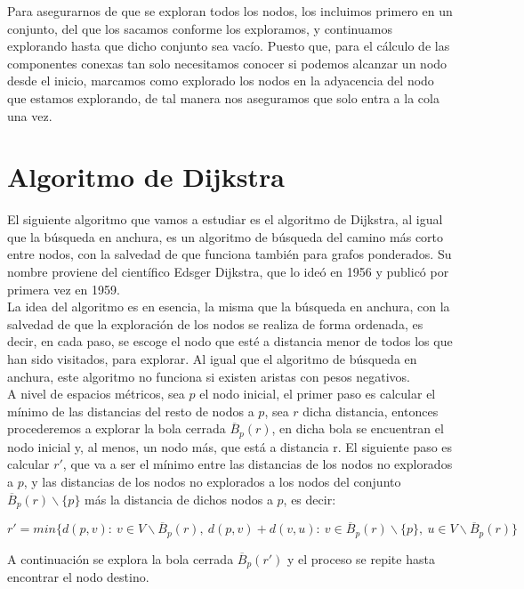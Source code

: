 Para asegurarnos de que se exploran todos los nodos, los incluimos primero en un conjunto, del que los sacamos conforme los exploramos, y continuamos explorando hasta que dicho conjunto sea vacío. Puesto que, para el cálculo de las componentes conexas tan solo necesitamos conocer si podemos alcanzar un nodo desde el inicio, marcamos como explorado los nodos en la adyacencia del nodo que estamos explorando, de tal manera nos aseguramos que solo entra a la cola una vez. 

\section{Algoritmo de Dijkstra}

El siguiente algoritmo que vamos a estudiar es el algoritmo de Dijkstra, al igual que la búsqueda en anchura, es un algoritmo de búsqueda del camino más corto entre nodos, con la salvedad de que funciona también para grafos ponderados. Su nombre proviene del científico Edsger Dijkstra, que lo ideó en 1956 y publicó por primera vez en 1959. \\

La idea del algoritmo es en esencia, la misma que la búsqueda en anchura, con la salvedad de que la exploración de los nodos se realiza de forma ordenada, es decir, en cada paso, se escoge el nodo que esté a distancia menor de todos los que han sido visitados, para explorar. Al igual que el algoritmo de búsqueda en anchura, este algoritmo no funciona si existen aristas con pesos negativos. \\

A nivel de espacios métricos, sea $p$ el nodo inicial, el primer paso es calcular el mínimo de las distancias del resto de nodos a $p$, sea $r$ dicha distancia, entonces procederemos a explorar la bola cerrada $\overline B_p(r)$, en dicha bola se encuentran el nodo inicial y, al menos, un nodo más, que está a distancia r. El siguiente paso es calcular $r'$, que va a ser el mínimo entre las distancias de los nodos no explorados a $p$, y las distancias de los nodos no explorados a los nodos del conjunto $\overline B_p(r)\backslash\{p\}$ más la distancia de dichos nodos a $p$, es decir:

$$r' = min\{d(p,v):\ v \in V\backslash\overline B_p(r),\ d(p,v) + d(v,u):\ v \in \overline B_p(r)\backslash\{p\},\ u \in V\backslash\overline B_p(r)\}$$

A continuación se explora la bola cerrada $\overline B_p(r')$ y el proceso se repite hasta encontrar el nodo destino.

